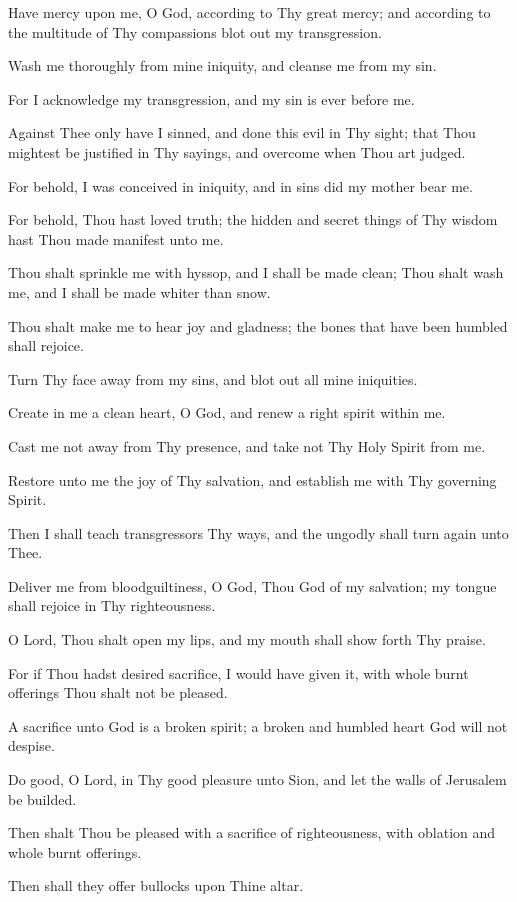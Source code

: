 Have mercy upon me, O God, according to Thy great mercy; and according to the multitude of Thy compassions blot out my transgression.

Wash me thoroughly from mine iniquity, and cleanse me from my sin.

For I acknowledge my transgression, and my sin is ever before me.

Against Thee only have I sinned, and done this evil in Thy sight; that Thou mightest be justified in Thy sayings, and overcome when Thou art judged.

For behold, I was conceived in iniquity, and in sins did my mother bear me.

For behold, Thou hast loved truth; the hidden and secret things of Thy wisdom hast Thou made manifest unto me.

Thou shalt sprinkle me with hyssop, and I shall be made clean; Thou shalt wash me, and I shall be made whiter than snow.

Thou shalt make me to hear joy and gladness; the bones that have been humbled shall rejoice.

Turn Thy face away from my sins, and blot out all mine iniquities.

Create in me a clean heart, O God, and renew a right spirit within me.

Cast me not away from Thy presence, and take not Thy Holy Spirit from me.

Restore unto me the joy of Thy salvation, and establish me with Thy governing Spirit.

Then I shall teach transgressors Thy ways, and the ungodly shall turn again unto Thee.

Deliver me from bloodguiltiness, O God, Thou God of my salvation; my tongue shall rejoice in Thy righteousness.

O Lord, Thou shalt open my lips, and my mouth shall show forth Thy praise.

For if Thou hadst desired sacrifice, I would have given it, with whole burnt offerings Thou shalt not be pleased.

A sacrifice unto God is a broken spirit; a broken and humbled heart God will not despise.

Do good, O Lord, in Thy good pleasure unto Sion, and let the walls of Jerusalem be builded.

Then shalt Thou be pleased with a sacrifice of righteousness, with oblation and whole burnt offerings.

Then shall they offer bullocks upon Thine altar.
